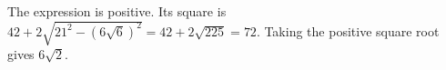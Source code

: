 The expression is positive. Its square is $42+2\sqrt{21^2-(6\sqrt6)^2}=42+2\sqrt{225}=72$. Taking the positive square root gives $\boxed{6\sqrt2}$.

